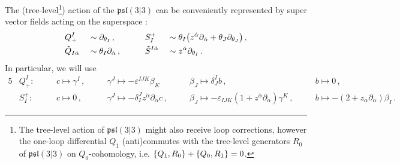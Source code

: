 \documentclass[11pt]{article}
\begin{document}
The (tree-level\footnote{The tree-level action of $\mathfrak{psl}(3|3)$ might also receive loop corrections, however the one-loop differential $Q_1$ (anti)commutes with the tree-level generators $R_0$ of $\mathfrak{psl}(3|3)$ on $Q_0$-cohomology, i.e. $\qty{Q_1,R_0}+\qty{Q_0,R_1}=0$.}) action of the $\mathfrak{psl}(3|3)$ can be conveniently represented by super vector fields acting on the superspace \cite{Saberi:2019fkq}:
\begin{alignat}{4}
    & Q^I_{+} 
        && \sim \partial_{\theta_I} \, , \qquad 
        && S_I^{+} 
        &&\sim \theta_I \qty( z^{\dot\alpha}\partial_{\dot\alpha} + \theta_J\partial_{\theta_J} )\,, \\
    & \tilde{Q}_{I\dot \alpha} 
        && \sim \theta_I \partial_{\dot\alpha} \, , \qquad 
        && \tilde{S}^{I\dot\alpha} 
        &&\sim z^{\dot\alpha} \partial_{\theta_I} \, .
\end{alignat}
In particular, we will use
\begin{alignat}{5}
    & Q^I_+ : \quad 
        && c \mapsto \gamma^I \, , \quad 
        && \gamma^J \mapsto -\varepsilon^{IJK}\beta_K \,\quad 
        && \beta_J \mapsto \delta^I_J b \, , \quad 
        && b\mapsto 0\,, \\
    & S_I^+ : \quad 
        && c \mapsto 0 \, , \quad 
        && \gamma^J \mapsto -\delta^J_I z^{\dot\alpha}\partial_{\dot\alpha}c \, , \quad 
        && \beta_J \mapsto -\varepsilon_{IJK} (1+z^{\dot\alpha}\partial_{\dot\alpha})\gamma^K \, , \quad && b\mapsto -(2+z_{\dot\alpha}\partial_{\dot\alpha}) \beta_I \, .
\end{alignat}
\end{document}
